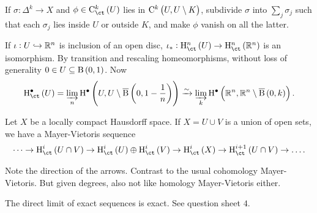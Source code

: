 \begin{remark*}
If $ \sigma : \Delta^k \to X $ and $ \phi \in \C_{\ct}^k\br{U} $ lies in $ \C^k\br{U, U \setminus K} $, subdivide $ \sigma $ into $ \sum_j \sigma_j $ such that each $ \sigma_j $ lies inside $ U $ or outside $ K $, and make $ \phi $ vanish on all the latter.
\end{remark*}

\begin{example*}
If $ \iota : U \hookrightarrow \mathbb{R}^n $ is inclusion of an open disc, $ \iota_* : \Hc^n\br{U} \to \Hc^n\br{\RR^n} $ is an isomorphism. By transition and rescaling homeomorphisms, without loss of generality $ 0 \in U \subseteq \B\br{0, 1} $. Now
$$ \Hc^\bullet\br{U} = \varinjlim_n \H^\bullet\br{U, U \setminus \overline{\B}\br{0, 1 - \dfrac{1}{n}}} \xrightarrow{\sim} \varinjlim_k \H^\bullet\br{\RR^n, \RR^n \setminus \overline{\B}\br{0, k}}. $$
\end{example*}

\begin{proposition}
Let $ X $ be a locally compact Hausdorff space. If $ X = U \cup V $ is a union of open sets, we have a Mayer-Vietoris sequence
$$ \dots \to \Hc^i\br{U \cap V} \to \Hc^i\br{U} \oplus \Hc^i\br{V} \to \Hc^i\br{X} \to \Hc^{i + 1}\br{U \cap V} \to \dots. $$
\end{proposition}

Note the direction of the arrows. Contrast to the usual cohomology Mayer-Vietoris. But given degrees, also not like homology Mayer-Vietoris either.

\pagebreak

\begin{remark*}
The direct limit of exact sequences is exact. See question sheet $ 4 $.
\end{remark*}

